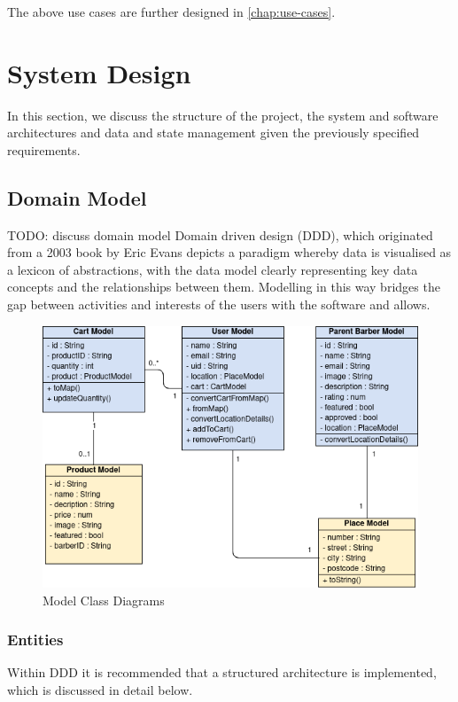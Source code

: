 \documentclass[12pt]{article}
\begin{document}
	The above use cases are further designed in \autoref{chap:use-cases}.

	
	\section{System Design}
	In this section, we discuss the structure of the project, the system and software architectures and data and state management given the previously specified requirements. 
	
	\subsection{Domain Model}
	TODO: discuss domain model
	Domain driven design (DDD), which originated from a 2003 book by Eric Evans \cite{evansDomainDrivenDesignTackling2003} depicts a paradigm whereby data is visualised as a lexicon of abstractions, with the data model clearly representing key data concepts and the relationships between them. Modelling in this way bridges the gap between activities and interests of the users with the software and allows.
	
	
	\begin{figure}[H]
		\centering
		\includegraphics[scale=0.7]{images/model-class-diagrams.png}
		\caption{Model Class Diagrams}
		\label{fig:model-class-diagrams}
	\end{figure}
	
	\subsubsection{Entities}
	
	Within DDD it is recommended that a structured architecture is implemented, which is discussed in detail below.
	
\end{document}
